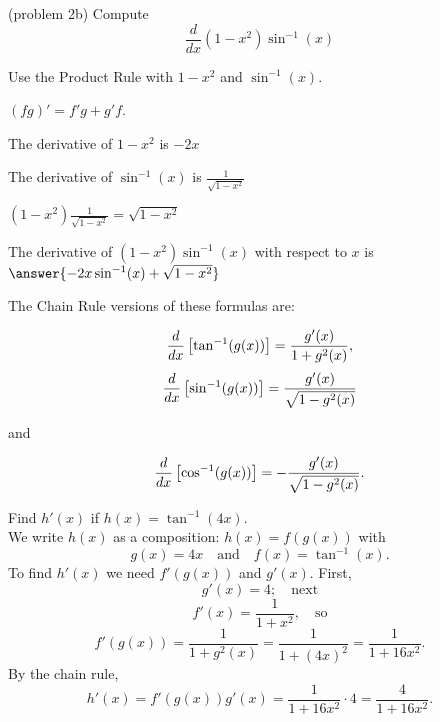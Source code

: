 \documentclass[handout]{ximera}
\begin{document}
\begin{problem}(problem 2b)
  Compute
  \[
  \frac{d}{dx} (1-x^2) \sin^{-1}(x)
  \]
  
    \begin{hint}
      Use the Product Rule with $1-x^2$ and $\sin^{-1}(x)$.
    \end{hint}
    \begin{hint}
      $(fg)' = f'g+g'f$.
    \end{hint}
    \begin{hint}
      The derivative of $1 - x^2$ is $-2x$
    \end{hint}
    \begin{hint}
      The derivative of $\sin^{-1}(x)$ is $\frac{1}{\sqrt{1-x^2}}$
    \end{hint}
		\begin{hint}
       $(1-x^2) \frac{1}{\sqrt{1-x^2}} = \sqrt{1-x^2}$
    \end{hint}
		The derivative of $(1-x^2)\sin^{-1}(x)$ with respect to $x$ is
		 $\answer{-2x \sin^{-1}(x) + \sqrt{1-x^2}}$
		
\end{problem}


The Chain Rule versions of these formulas are:


\[
 \frac{d}{\mathop{}\!d x} \left[\tan^{-1}(g(x))\right] = \frac{g'(x)}{1 + g^2(x)},
\]
\[
 \frac{d}{\mathop{}\!d x} \left[\sin^{-1}(g(x))\right] = \frac{g'(x)}{\sqrt{1 - g^2(x)}}
\]

and

\[
 \frac{d}{\mathop{}\!d x} \left[\cos^{-1}(g(x))\right] = -\frac{g'(x)}{\sqrt{1 - g^2(x)}}.
\]


\begin{example}[example 3]
Find $h'(x)$ if $h(x) = \tan^{-1}(4x)$.\\
We write $h(x)$ as a composition: $h(x)=f(g(x))$ with 
\[g(x) = 4x  \quad \text{and} \quad  f(x) = \tan^{-1}(x).\]
 To find $h'(x)$ we need $f'(g(x))$ and $g'(x)$.  First, 
\[g'(x) = 4; \quad \text{next} \] 
\[f'(x) = \frac{1}{1+x^2} , \quad \text{so}\]
\[ f'(g(x)) = \frac{1}{1+g^2(x)} =\frac{1}{1+(4x)^2}=\frac{1}{1+16x^2}.\]
By the chain rule,
\[h'(x) = f'(g(x))g'(x) = \frac{1}{1+16x^2} \cdot 4 = \frac{4}{1+16x^2}.\]
\end{example}

\begin{center}
\begin{foldable}
\end{foldable}
\end{center}
\end{document}
